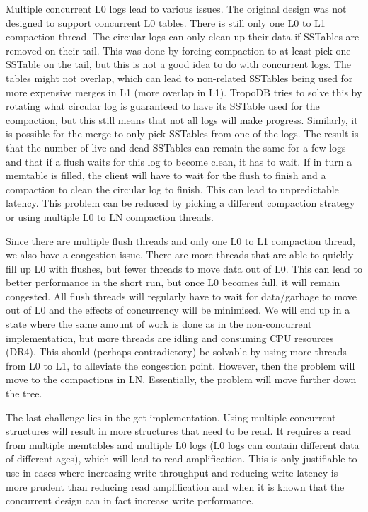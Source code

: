Multiple concurrent L0 logs lead to various issues. The original design was not designed to support concurrent L0 tables. There is still only one L0 to L1 compaction thread. The circular logs can only clean up their data if SSTables are removed on their tail. This was done by forcing compaction to at least pick one SSTable on the tail, but this is not a good idea to do with concurrent logs. The tables might not overlap, which can lead to non-related SSTables being used for more expensive merges in L1 (more overlap in L1). TropoDB tries to solve this by rotating what circular log is guaranteed to have its SSTable used for the compaction, but this still means that not all logs will make progress. Similarly, it is possible for the merge to only pick SSTables from one of the logs. The result is that the number of live and dead SSTables can remain the same for a few logs and that if a flush waits for this log to become clean, it has to wait. If in turn a memtable is filled, the client will have to wait for the flush to finish and a compaction to clean the circular log to finish. This can lead to unpredictable latency. This problem can be reduced by picking a different compaction strategy or using multiple L0 to LN compaction threads. 

Since there are multiple flush threads and only one L0 to L1 compaction thread, we also have a congestion issue. There are more threads that are able to quickly fill up L0 with flushes, but fewer threads to move data out of L0. This can lead to better performance in the short run, but once L0 becomes full, it will remain congested. All flush threads will regularly have to wait for data/garbage to move out of L0 and the effects of concurrency will be minimised. We will end up in a state where the same amount of work is done as in the non-concurrent implementation, but more threads are idling and consuming CPU resources (DR4). This should (perhaps contradictory) be solvable by using more threads from L0 to L1, to alleviate the congestion point. However, then the problem will move to the compactions in LN. Essentially, the problem will move further down the tree.

The last challenge lies in the get implementation. Using multiple concurrent structures will result in more structures that need to be read. It requires a read from multiple memtables and multiple L0 logs (L0 logs can contain different data of different ages), which will lead to read amplification. This is only justifiable to use in cases where increasing write throughput and reducing write latency is more prudent than reducing read amplification and when it is known that the concurrent design can in fact increase write performance.

